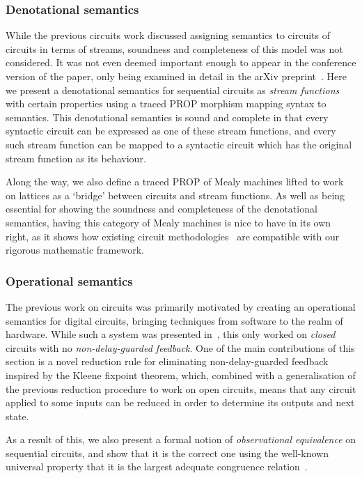 \subsubsection{Denotational semantics}

While the previous circuits work discussed assigning semantics to circuits
of circuits in terms of streams, soundness and completeness of this model was
not considered.
It was not even deemed important enough to appear in the conference version of
the paper, only being examined in detail in the arXiv
preprint~\cite{ghica2017diagrammatica}.
Here we present a denotational semantics for sequential circuits as
\emph{stream functions} with certain properties using a traced PROP morphism
mapping syntax to semantics.
This denotational semantics is sound and complete in that every syntactic
circuit can be expressed as one of these stream functions, and every such stream
function can be mapped to a syntactic circuit which has the original stream
function as its behaviour.

Along the way, we also define a traced PROP of Mealy machines lifted to work on
lattices as a `bridge' between circuits and stream functions.
As well as being essential for showing the soundness and completeness of the
denotational semantics, having this category of Mealy machines is nice to have
in its own right, as it shows how existing circuit
methodologies~\cite{kohavi2009switching} are compatible with our rigorous
mathematic framework.

\subsubsection{Operational semantics}

The previous work on circuits was primarily motivated by creating an operational
semantics for digital circuits, bringing techniques from software to the realm
of hardware.
While such a system was presented in~\cite{ghica2017diagrammatic}, this only
worked on \emph{closed} circuits with no \emph{non-delay-guarded feedback}.
One of the main contributions of this section is a novel reduction rule for
eliminating non-delay-guarded feedback inspired by the Kleene fixpoint theorem,
which, combined with a generalisation of the previous reduction procedure to
work on open circuits, means that any circuit applied to some inputs can be
reduced in order to determine its outputs and next state.

As a result of this, we also present a formal notion of
\emph{observational equivalence} on sequential circuits, and show that it is the
correct one using the well-known universal property that it is the largest
adequate congruence relation~\cite{gordon1998operational}.


